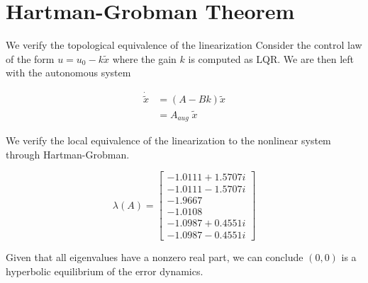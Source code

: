 \lstset{language=Matlab}

\section{\textbf{Hartman-Grobman Theorem}}
\noindent We verify the topological equivalence of the linearization Consider the control law of the form $u = u_0 - k\tilde{x}$ where the gain $k$ is computed as LQR. We are then left with the autonomous system

\[ \begin{aligned}
    \dot{\tilde{x}} &= (A - Bk)\tilde{x} \\
                    &= A_{aug} \; \tilde{x}
\end{aligned} \]

\noindent We verify the local equivalence of the linearization to the nonlinear system through Hartman-Grobman.

\[ \lambda(A) = \begin{bmatrix}
    -1.0111 + 1.5707i \\
    -1.0111 - 1.5707i \\
    -1.9667 \\
    -1.0108 \\
    -1.0987 + 0.4551i \\
    -1.0987 - 0.4551i
\end{bmatrix}\]

\noindent Given that all eigenvalues have a nonzero real part, we can conclude $(0,0)$ is a hyperbolic equilibrium of the error dynamics.
